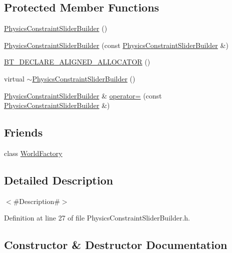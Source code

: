\subsection*{Protected Member Functions}
\begin{DoxyCompactItemize}
\item 
\mbox{\hyperlink{classnjli_1_1_physics_constraint_slider_builder_a16177681a967d5d1252b283a5a730452}{Physics\+Constraint\+Slider\+Builder}} ()
\item 
\mbox{\hyperlink{classnjli_1_1_physics_constraint_slider_builder_a5f2070b8a634fdc49a3c8ac1f6e3abbb}{Physics\+Constraint\+Slider\+Builder}} (const \mbox{\hyperlink{classnjli_1_1_physics_constraint_slider_builder}{Physics\+Constraint\+Slider\+Builder}} \&)
\item 
\mbox{\hyperlink{classnjli_1_1_physics_constraint_slider_builder_a7493730f0cfc648a7ba4e1220aece78c}{B\+T\+\_\+\+D\+E\+C\+L\+A\+R\+E\+\_\+\+A\+L\+I\+G\+N\+E\+D\+\_\+\+A\+L\+L\+O\+C\+A\+T\+OR}} ()
\item 
virtual \mbox{\hyperlink{classnjli_1_1_physics_constraint_slider_builder_add7e5d7ff7a64025443104278cd5564c}{$\sim$\+Physics\+Constraint\+Slider\+Builder}} ()
\item 
\mbox{\hyperlink{classnjli_1_1_physics_constraint_slider_builder}{Physics\+Constraint\+Slider\+Builder}} \& \mbox{\hyperlink{classnjli_1_1_physics_constraint_slider_builder_af241f4529e2d0e4cc6cb9912dc064dcd}{operator=}} (const \mbox{\hyperlink{classnjli_1_1_physics_constraint_slider_builder}{Physics\+Constraint\+Slider\+Builder}} \&)
\end{DoxyCompactItemize}
\subsection*{Friends}
\begin{DoxyCompactItemize}
\item 
class \mbox{\hyperlink{classnjli_1_1_physics_constraint_slider_builder_acb96ebb09abe8f2a37a915a842babfac}{World\+Factory}}
\end{DoxyCompactItemize}


\subsection{Detailed Description}
$<$\#\+Description\#$>$ 

Definition at line 27 of file Physics\+Constraint\+Slider\+Builder.\+h.



\subsection{Constructor \& Destructor Documentation}
\mbox{\label{classnjli_1_1_physics_constraint_slider_builder_a16177681a967d5d1252b283a5a730452}} 
